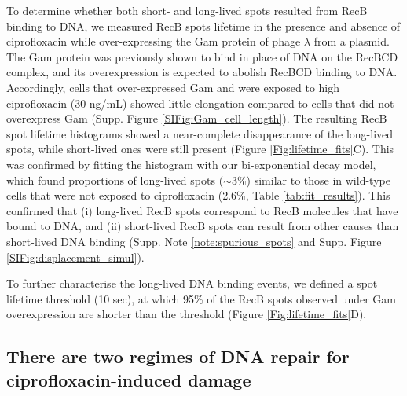 To determine whether both short- and long-lived spots resulted from RecB binding to DNA, we measured RecB spots lifetime in the presence and absence of ciprofloxacin while over-expressing the Gam protein of phage $\lambda$ from a plasmid. The Gam protein was previously shown to bind in place of DNA on the RecBCD complex\cite{Wilkinson2016}, and its overexpression is expected to abolish RecBCD binding to DNA. Accordingly, cells that over-expressed Gam and were exposed to high ciprofloxacin (30 ng/mL) showed little elongation compared to cells that did not overexpress Gam (Supp. Figure \ref{SIFig:Gam_cell_length}). The resulting RecB spot lifetime histograms showed a near-complete disappearance of the long-lived spots, while short-lived ones were still present (Figure \ref{Fig:lifetime_fits}C). This was confirmed by fitting the histogram with our bi-exponential decay model, which found proportions of long-lived spots ($\sim$3\%) similar to those in wild-type cells that were not exposed to ciprofloxacin (2.6\%, Table \ref{tab:fit_results}). This confirmed that (i) long-lived RecB spots correspond to RecB molecules that have bound to DNA, and (ii) short-lived RecB spots can result from other causes than short-lived DNA binding (Supp. Note \ref{note:spurious_spots} and Supp. Figure \ref{SIFig:displacement_simul}).

To further characterise the long-lived DNA binding events, we defined a spot lifetime threshold (10 sec), at which 95\% of the RecB spots observed under Gam overexpression are shorter than the threshold (Figure \ref{Fig:lifetime_fits}D).

\subsection*{There are two regimes of DNA repair for ciprofloxacin-induced damage}

